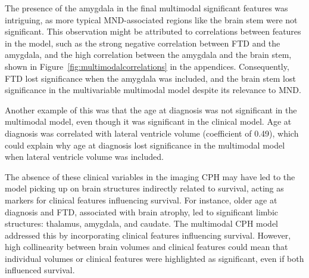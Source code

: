 

The presence of the amygdala in the final multimodal significant features was intriguing, as more typical MND-associated regions like the brain stem were not significant.
This observation might be attributed to correlations between features in the model, such as the strong negative correlation between FTD and the amygdala, and the high correlation between the amygdala and the brain stem, shown in Figure~\ref{fig:multimodalcorrelations} in the appendices.
Consequently, FTD lost significance when the amygdala was included, and the brain stem lost significance in the multivariable multimodal model despite its relevance to MND.

Another example of this was that the age at diagnosis was not significant in the multimodal model, even though it was significant in the clinical model.
Age at diagnosis was correlated with lateral ventricle volume (coefficient of 0.49), which could explain why age at diagnosis lost significance in the multimodal model when lateral ventricle volume was included.

The absence of these clinical variables in the imaging CPH may have led to the model picking up on brain structures indirectly related to survival, acting as markers for clinical features influencing survival.
For instance, older age at diagnosis and FTD, associated with brain atrophy, led to significant limbic structures: thalamus, amygdala, and caudate.
The multimodal CPH model addressed this by incorporating clinical features influencing survival.
However, high collinearity between brain volumes and clinical features could mean that individual volumes or clinical features were highlighted as significant, even if both influenced survival.

